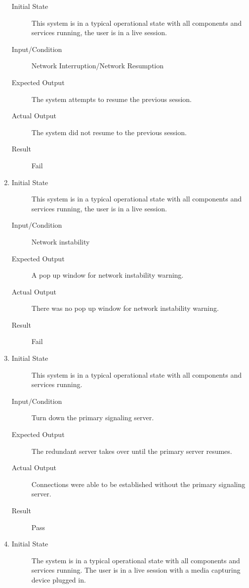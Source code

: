 \documentclass[12pt, titlepage]{article}
\begin{document}
\begin{enumerate}[NFR-T1]
\begin{description}
    \item[Initial State] This system is in a typical operational state with all
      components and services running, the user is in a live session.
    \item[Input/Condition] Network Interruption/Network Resumption
    \item[Expected Output] The system attempts to resume the previous session.
    \item[Actual Output] The system did not resume to the previous session.
    \item[Result] Fail
    \end{description}
  \item \label{NFRT8}
    \begin{description}
    \item[Initial State] This system is in a typical operational state with all
      components and services running, the user is in a live session.
    \item[Input/Condition] Network instability
    \item[Expected Output] A pop up window for network instability warning.
    \item[Actual Output] There was no pop up window for network instability
      warning.
    \item[Result] Fail
    \end{description}
  \item \label{NFRT9}
    \begin{description}
    \item[Initial State] This system is in a typical operational state with all
      components and services running.
    \item[Input/Condition] Turn down the primary signaling server.
    \item[Expected Output] The redundant server takes over until the primary server
      resumes.
    \item[Actual Output] Connections were able to be established without the
      primary signaling server.
    \item[Result] Pass
    \end{description}
  \item \label{NFRT10}
    \begin{description}
    \item[Initial State] The system is in a typical operational state with all
      components and services running. The user is in a live session with a
      media capturing device plugged in.

\end{description}
\end{enumerate}
\end{document}
